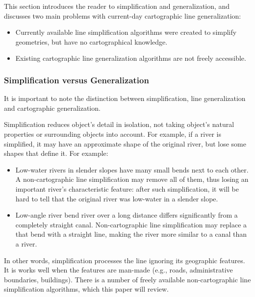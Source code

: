 \documentclass[a4paper]{article}
\begin{document}
This section introduces the reader to simplification and generalization, and
discusses two main problems with current-day cartographic line generalization:

\begin{itemize}
    \item Currently available line simplification algorithms were created
        to simplify geometries, but have no cartographical knowledge.

    \item Existing cartographic line generalization algorithms are not freely
        accessible.
\end{itemize}

\subsubsection{Simplification versus Generalization}

It is important to note the distinction between simplification, line
generalization and cartographic generalization.

Simplification reduces object's detail in isolation, not taking object's
natural properties or surrounding objects into account. For example, if a
river is simplified, it may have an approximate shape of the original river,
but lose some shapes that define it. For example:

\begin{itemize}

  \item Low-water rivers in slender slopes have many small bends next to each
      other. A non-cartographic line simplification may remove all of them,
        thus losing an important river's characteristic feature: after such
        simplification, it will be hard to tell that the original river was
        low-water in a slender slope.

  \item Low-angle river bend river over a long distance differs significantly
      from a completely straight canal. Non-cartographic line simplification
        may replace a that bend with a straight line, making the river more
        similar to a canal than a river.

\end{itemize}

In other words, simplification processes the line ignoring its geographic
features. It is works well when the features are man-made (e.g., roads,
administrative boundaries, buildings). There is a number of freely available
non-cartographic line simplification algorithms, which this paper will review.
\end{document}
